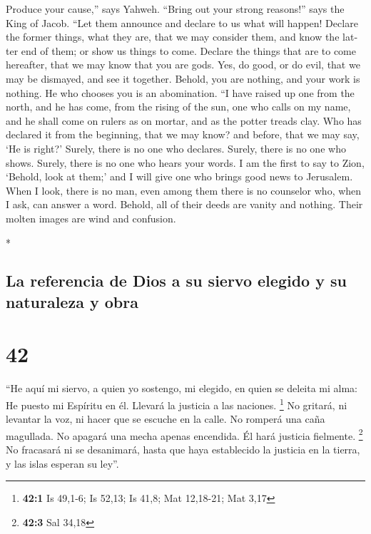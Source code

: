 \begin{paracol}{2}
\begin{otherlanguage}{english}
 Produce your cause,'' says Yahweh. ``Bring out your
strong reasons!'' says the King of Jacob.  ``Let them
announce and declare to us what will happen! Declare the former things,
what they are, that we may consider them, and know the latter end of
them; or show us things to come.  Declare the things that
are to come hereafter, that we may know that you are gods. Yes, do good,
or do evil, that we may be dismayed, and see it together.
 Behold, you are nothing, and your work is nothing. He
who chooses you is an abomination.  ``I have raised up
one from the north, and he has come, from the rising of the sun, one who
calls on my name, and he shall come on rulers as on mortar, and as the
potter treads clay.  Who has declared it from the
beginning, that we may know? and before, that we may say, `He is right?'
Surely, there is no one who declares. Surely, there is no one who shows.
Surely, there is no one who hears your words.  I am the
first to say to Zion, `Behold, look at them;' and I will give one who
brings good news to Jerusalem.  When I look, there is no
man, even among them there is no counselor who, when I ask, can answer a
word.  Behold, all of their deeds are vanity and nothing.
Their molten images are wind and confusion.

\end{otherlanguage}

\switchcolumn[0]*

\hypertarget{la-referencia-de-dios-a-su-siervo-elegido-y-su-naturaleza-y-obra}{%
\subsection{La referencia de Dios a su siervo elegido y su naturaleza y
obra}\label{la-referencia-de-dios-a-su-siervo-elegido-y-su-naturaleza-y-obra}}

\hypertarget{section-82}{%
\section{42}\label{section-82}}

 ``He aquí mi siervo, a quien yo sostengo, mi elegido, en
quien se deleita mi alma: He puesto mi Espíritu en él. Llevará la
justicia a las naciones. \footnote{\textbf{42:1} Is 49,1-6; Is 52,13; Is
  41,8; Mat 12,18-21; Mat 3,17}  No gritará, ni levantar
la voz, ni hacer que se escuche en la calle.  No romperá
una caña magullada. No apagará una mecha apenas encendida. Él hará
justicia fielmente. \footnote{\textbf{42:3} Sal 34,18}  No
fracasará ni se desanimará, hasta que haya establecido la justicia en la
tierra, y las islas esperan su ley''.


\end{paracol}
